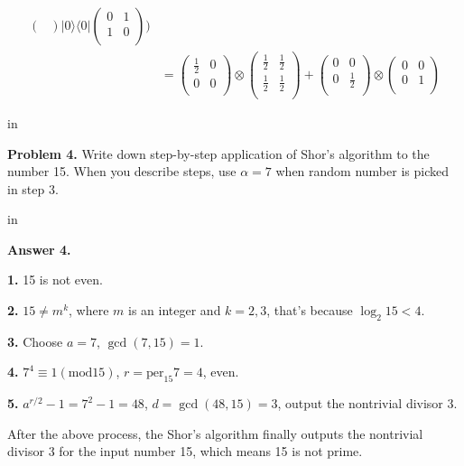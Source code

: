 \documentclass[11pt]{article}
\begin{document}
$$\begin{aligned}
\begin{pmatrix}
\end{pmatrix}|0\rangle\langle0|\begin{pmatrix}
0&1\\
1&0\\
\end{pmatrix})\\
&=\begin{pmatrix}
	\frac{1}{2}&0\\
	0&0\\
\end{pmatrix}\otimes\begin{pmatrix}
\frac{1}{2}&\frac{1}{2}\\
\frac{1}{2}&\frac{1}{2}\\
\end{pmatrix}+\begin{pmatrix}
0&0\\
0&\frac{1}{2}\\
\end{pmatrix}\otimes\begin{pmatrix}
0&0\\
0&1\\
\end{pmatrix}
\end{aligned}
$$

 in

{\bf Problem 4.} Write down step-by-step application of Shor’s algorithm to the number 15. When you describe steps, use $\alpha=7$ when random number is picked in step 3.

 in

{\bf Answer 4.}

\noindent \textbf{1.} 15 is not even.

\noindent \textbf{2.} $15\neq m^k$, where $m$ is an integer and $k=2,3$, that's because $\log_2 15<4$.

\noindent \textbf{3.} Choose $a=7$, $\gcd(7, 15)=1$.

\noindent \textbf{4.} $7^4\equiv1(\text{mod}15)$, $r=\text{per}_{15}7=4$, even.

\noindent \textbf{5.} $a^{r/2}-1=7^2-1=48$, $d=\gcd(48,15)=3$, output the nontrivial divisor 3.

After the above process, the Shor’s algorithm finally outputs the nontrivial divisor 3 for the input number 15, which
means 15 is not prime.
\end{document}
